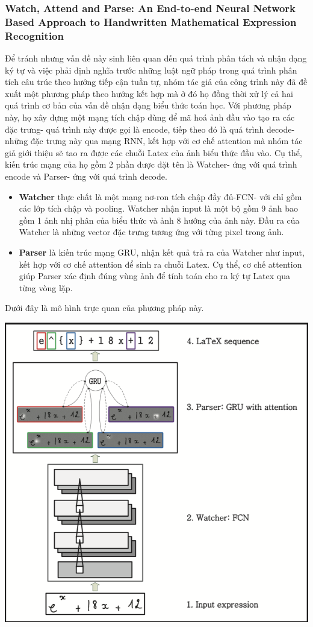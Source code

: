 \documentclass[a4paper,12pt]{article}
\begin{document}
	\subsubsection{Watch, Attend and Parse: An End-to-end Neural Network Based Approach to Handwritten Mathematical Expression Recognition\cite{zhang2017watch}} 
	Để tránh nhưng vấn đề nảy sinh liên quan đến quá trình phân tách và nhận dạng ký tự và việc phải định nghĩa trước những luật ngữ pháp trong quá trình phân tích câu trúc theo hướng tiếp cận tuần tự, nhóm tác giả của công trình này đã đề xuất một phương pháp theo hướng kết hợp mà ở đó họ đồng thời xử lý cả hai quá trình cơ bản của vấn đề nhận dạng biểu thức toán học. Với phương pháp này, họ xây dựng một mạng tích chập dùng để mã hoá ảnh đầu vào tạo ra các đặc trưng- quá trình này được gọi là encode, tiếp theo đó là quá trình decode- những đặc trưng này qua mạng RNN, kết hợp với cơ chế attention\cite{zhang2017watch} mà nhóm tác giả giới thiệu sẽ tao ra được các chuỗi Latex của ảnh biểu thức đầu vào.
	Cụ thể, kiến trúc mạng của họ gồm 2 phần được đặt tên là Watcher- ứng với quá trình encode và Parser- ứng với quá trình decode.
	\begin{itemize}
		\item \textbf{Watcher} thực chất là một mạng nơ-ron tích chập đầy đủ-FCN- với chỉ gồm các lớp tích chập và pooling. Watcher nhận input là một bộ gồm 9 ảnh bao gồm 1 ảnh nhị phân của biểu thức và ảnh 8 hướng của ảnh này. Đầu ra của Watcher là những vector đặc trưng tương ứng với từng pixel trong ảnh. 
		\item \textbf{Parser} là kiến trúc mạng GRU\cite{cho2014properties}, nhận kết quả trả ra của Watcher như input, kết hợp với cơ chế attention để sinh ra chuỗi Latex. Cụ thể, cơ chế attention giúp Parser xác định đúng vùng ảnh để tính toán cho ra ký tự Latex qua từng vòng lặp.
	\end{itemize}
	Dưới đây là mô hình trực quan của phương pháp này.
	\begin{center}
		
		\centering
		\includegraphics[width=0.6\linewidth]{WAP}
		\vspace{0.5cm}
	\end{center}
	
\end{document}
